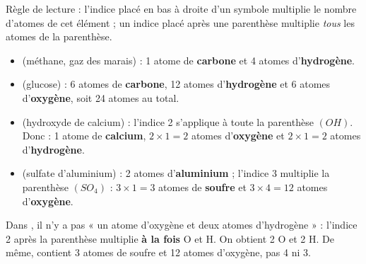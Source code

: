 \documentclass[11pt]{article}
\begin{document}
\begin{corrige}
Règle de lecture : l'indice placé en bas à droite d'un symbole multiplie le nombre d'atomes de cet élément ; un indice placé après une parenthèse multiplie \emph{tous} les atomes de la parenthèse.
\begin{itemize}
\item {} (méthane, gaz des marais) : 1 atome de \textbf{carbone} et 4 atomes d'\textbf{hydrogène}.
\item {} (glucose) : 6 atomes de \textbf{carbone}, 12 atomes d'\textbf{hydrogène} et 6 atomes d'\textbf{oxygène}, soit 24 atomes au total.
\item {} (hydroxyde de calcium) : l'indice 2 s'applique à toute la parenthèse $(OH)$. Donc : 1 atome de \textbf{calcium}, $2 \times 1 = 2$ atomes d'\textbf{oxygène} et $2 \times 1 = 2$ atomes d'\textbf{hydrogène}.
\item {} (sulfate d'aluminium) : 2 atomes d'\textbf{aluminium} ; l'indice 3 multiplie la parenthèse $(SO_4)$ : $3 \times 1 = 3$ atomes de \textbf{soufre} et $3 \times 4 = 12$ atomes d'\textbf{oxygène}.
\end{itemize}
\end{corrige}

\begin{attention}
Dans , il n'y a pas « un atome d'oxygène et deux atomes d'hydrogène » : l'indice 2 après la parenthèse multiplie \textbf{à la fois} O et H. On obtient 2 O et 2 H. De même,  contient 3 atomes de soufre et 12 atomes d'oxygène, pas 4 ni 3.
\end{attention}
\end{document}
